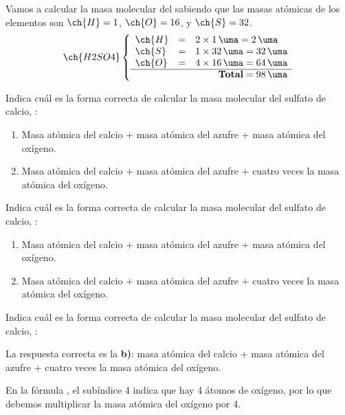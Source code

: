 \begin{example}{}
    Vamos a calcular la masa molecular del  sabiendo que las masas atómicas de los elementos son \( \ch{H} = 1 \), \( \ch{O} = 16 \), y \( \ch{S} = 32 \).
    \[
        \ch{H2SO4} \left\{\rule{0pt}{0.8cm}
                       \begin{array}{lcl}
                           \ch{H} &=& 2 \times \qty{1}{\uma} = \qty{2}{\uma} \\
                           \ch{S} &=& 1 \times \qty{32}{\uma} = \qty{32}{\uma} \\
                           \ch{O} &=& 4 \times \qty{16}{\uma} = \qty{64}{\uma} \\
                           \cline{1-3}
                           \multicolumn{3}{r}{\textbf{Total} = \qty{98}{\uma}}
                       \end{array}
        \right.
    \]
\end{example}



\begin{exercise}
    Indica cuál es la forma correcta de calcular la masa molecular del sulfato de calcio, :
    \begin{enumerate}[label=\letraminuscula]
\item Masa atómica del calcio + masa atómica del azufre + masa atómica del oxígeno.
\item Masa atómica del calcio + masa atómica del azufre + cuatro veces la masa atómica del oxígeno.
    \end{enumerate}
    \begin{solu}
        Indica cuál es la forma correcta de calcular la masa molecular del sulfato de calcio, :
        \begin{enumerate}[label=\letraminuscula]
\item Masa atómica del calcio + masa atómica del azufre + masa atómica del oxígeno.
\item Masa atómica del calcio + masa atómica del azufre + cuatro veces la masa atómica del oxígeno.
        \end{enumerate}
        Indica cuál es la forma correcta de calcular la masa molecular del sulfato de calcio, :

        La respuesta correcta es la \textbf{b)}: masa atómica del calcio + masa atómica del azufre + cuatro veces la masa atómica del oxígeno.

        En la fórmula , el subíndice 4 indica que hay 4 átomos de oxígeno, por lo que debemos multiplicar la masa atómica del oxígeno por 4.
    \end{solu}
\end{exercise}

